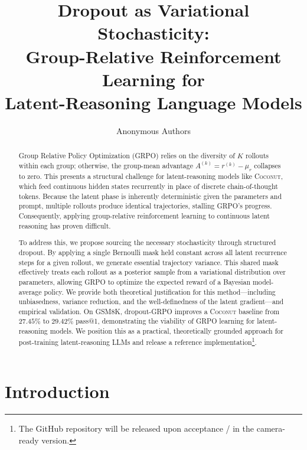 \documentclass[11pt]{article}
\title{Dropout as Variational Stochasticity: \\
       Group-Relative Reinforcement Learning for \\
       Latent-Reasoning Language Models}
\author{Anonymous Authors}
\date{}
\theoremstyle{definition}
\theoremstyle{remark}
\begin{document}
\maketitle

\begin{abstract}
Group Relative Policy Optimization (GRPO) relies on the diversity of $K$ rollouts
within each group; otherwise, the group-mean advantage $A^{(k)} = r^{(k)} - \mu_r$
collapses to zero. This presents a structural challenge for latent-reasoning
models like \textsc{Coconut}, which feed continuous hidden states recurrently in
place of discrete chain-of-thought tokens. Because the latent phase is inherently
deterministic given the parameters and prompt, multiple rollouts produce identical
trajectories, stalling GRPO's progress. Consequently, applying group-relative
reinforcement learning to continuous latent reasoning has proven difficult.

To address this, we propose sourcing the necessary stochasticity through
structured dropout. By applying a single Bernoulli mask held constant across
all latent recurrence steps for a given rollout, we generate essential trajectory
variance. This shared mask effectively treats each rollout as a posterior sample
from a variational distribution over parameters, allowing GRPO to optimize the
expected reward of a Bayesian model-average policy. We provide both theoretical
justification for this method---including unbiasedness, variance reduction, and
the well-definedness of the latent gradient---and empirical validation. On
\textsc{GSM8K}, dropout-GRPO improves a \textsc{Coconut} baseline from $27.45\%$
to $29.42\%$ pass@1, demonstrating the viability of GRPO learning for
latent-reasoning models. We position this as a practical, theoretically
grounded approach for post-training latent-reasoning LLMs and release a
reference implementation\footnote{The GitHub repository will be released upon acceptance / in the camera-ready version.}.
\end{abstract}

\section{Introduction}
\label{sec:intro}
\end{document}
